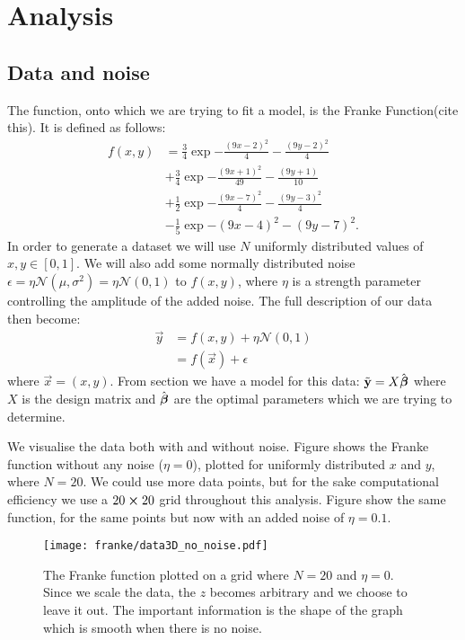 \section{Analysis}\label{sec:analysis}

    \subsection{Data and noise}\label{sec:data}
        The function, onto which we are trying to fit a model, is the Franke Function(cite this). It is defined as follows:
        \begin{align}\label{eq:francefunc}
            f(x,y) &= \frac{3}{4}\exp{-\frac{(9x-2)^2}{4}-\frac{(9y-2)^2}{4}} \nonumber\\
            &+ \frac{3}{4}\exp{-\frac{(9x+1)^2}{49}-\frac{(9y+1)}{10}} \nonumber\\
            &+ \frac{1}{2}\exp{-\frac{(9x-7)^2}{4}-\frac{(9y-3)^2}{4}} \nonumber\\
            &-\frac{1}{5}\exp{-(9x-4)^2-(9y-7)^2}.
        \end{align}
        In order to generate a dataset we will use $N$ uniformly distributed values of $x,y\in[0,1]$. We will also add some normally distributed noise $\epsilon = \eta\mathcal{N}(\mu,\sigma^2) = \eta\mathcal{N}(0,1)$ to $f(x,y)$, where $\eta$ is a strength parameter controlling the amplitude of the added noise. The full description of our data then become:
        \begin{align}\label{eq:datadescription}
            \vec{y} &= f(x,y) + \eta\mathcal{N}(0,1) \nonumber \\
            &= f(\vec{x}) + \epsilon
        \end{align}
        where $\vec{x} = (x,y)$. 
        From section  we have a model for this data: $\tilde{\mathbf{y}} = X\hat{\boldsymbol{\beta}}$ where $X$ is the design matrix and $\hat{\boldsymbol{\beta}}$ are the optimal parameters which we are trying to determine. 

        We visualise the data both with and without noise. Figure  shows the Franke function without any noise ($\eta=0$), plotted for uniformly distributed $x$ and $y$, where $N=20$. We could use more data points, but for the sake computational efficiency we use a $20\cross20$ grid throughout this analysis.  Figure  show the same function, for the same points but now with an added noise of $\eta=0.1$.

        \begin{figure}
            \texttt{[image: franke/data3D\_no\_noise.pdf]}
            \caption{The Franke function plotted on a grid where $N=20$ and $\eta=0$. Since we scale the data, the $z$ becomes arbitrary and we choose to leave it out. The important information is the shape of the graph which is smooth when there is no noise. }
            \label{fig:franke_function}
        \end{figure}

